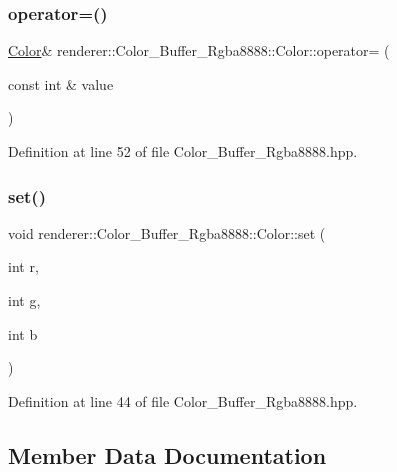 \subsubsection{\texorpdfstring{operator=()}{operator=()}}
{\footnotesize\ttfamily \mbox{\hyperlink{structrenderer_1_1_color___buffer___rgba8888_1_1_color}{Color}}\& renderer\+::\+Color\+\_\+\+Buffer\+\_\+\+Rgba8888\+::\+Color\+::operator= (\begin{DoxyParamCaption}\item[{const int \&}]{value }\end{DoxyParamCaption})\hspace{0.3cm}{\ttfamily [inline]}}



Definition at line 52 of file Color\+\_\+\+Buffer\+\_\+\+Rgba8888.\+hpp.

\mbox{\label{structrenderer_1_1_color___buffer___rgba8888_1_1_color_afcfb09b3969ab6d86caf666b38f10922}} 
\subsubsection{\texorpdfstring{set()}{set()}}
{\footnotesize\ttfamily void renderer\+::\+Color\+\_\+\+Buffer\+\_\+\+Rgba8888\+::\+Color\+::set (\begin{DoxyParamCaption}\item[{int}]{r,  }\item[{int}]{g,  }\item[{int}]{b }\end{DoxyParamCaption})\hspace{0.3cm}{\ttfamily [inline]}}



Definition at line 44 of file Color\+\_\+\+Buffer\+\_\+\+Rgba8888.\+hpp.



\subsection{Member Data Documentation}
\mbox{\label{structrenderer_1_1_color___buffer___rgba8888_1_1_color_ae3ecf9253316911b0b328d5bdfd9a617}} 
